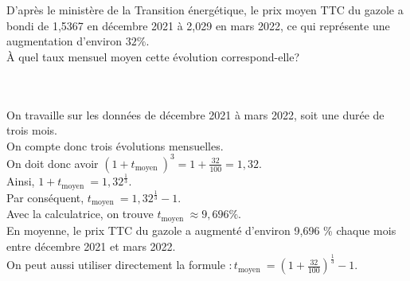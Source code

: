 \begin{exemple}
	D'après le ministère de la Transition énergétique, le prix moyen TTC du gazole a bondi de 1,5367 \EUR{} en décembre 2021 à 2,029 \EUR{} en mars 2022, ce qui représente une augmentation d'environ $32 \%$.\\
	À quel taux mensuel moyen cette évolution correspond-elle?
	
	\ \\
	\\
	
	On travaille sur les données de décembre 2021 à mars 2022, soit une durée de trois mois.\\
	On compte donc trois évolutions mensuelles.\\
	On doit donc avoir $\left(1+t_{\text {moyen }}\right)^3=1+\frac{32}{100}=1,32$.\\
	Ainsi, $1+t_{\text {moyen }}=1,32^{\frac{1}{3}}$.\\
	Par conséquent, $t_{\text {moyen }}=1,32^{\frac{1}{3}}-1$.\\
	Avec la calculatrice, on trouve $t_{\text {moyen }} \approx 9,696 \%$.\\
	En moyenne, le prix TTC du gazole a augmenté d'environ 9,696 \% chaque mois entre décembre 2021 et mars 2022.\\
	On peut aussi utiliser directement la formule $: t_{\text {moyen }}=\left(1+\frac{32}{100}\right)^{\frac{1}{3}}-1$.
\end{exemple}
